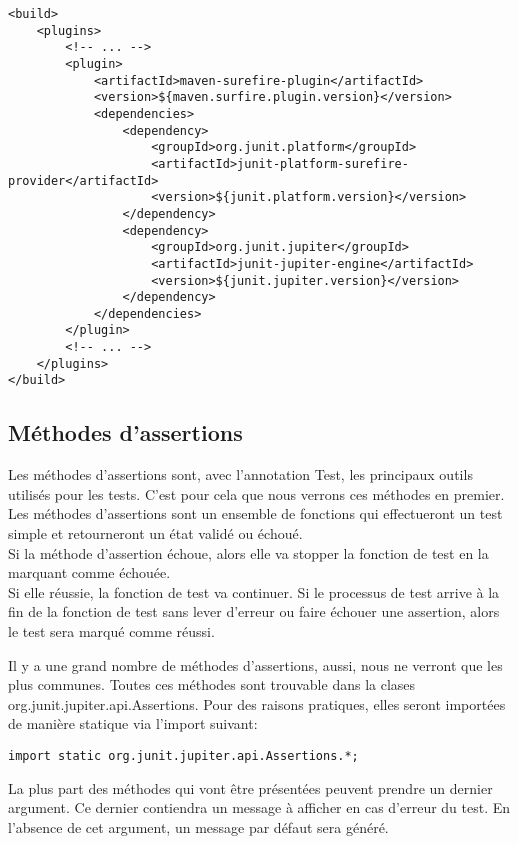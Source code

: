 \documentclass[12pt]{article}		%
\begin{document}
\lstset{language=XML, numbers=left}
\begin{lstlisting}
<build>
    <plugins>
    	<!-- ... -->
        <plugin>
            <artifactId>maven-surefire-plugin</artifactId>
            <version>${maven.surfire.plugin.version}</version>
            <dependencies>
                <dependency>
                    <groupId>org.junit.platform</groupId>
                    <artifactId>junit-platform-surefire-provider</artifactId>
                    <version>${junit.platform.version}</version>
                </dependency>
                <dependency>
                    <groupId>org.junit.jupiter</groupId>
                    <artifactId>junit-jupiter-engine</artifactId>
                    <version>${junit.jupiter.version}</version>
                </dependency>
            </dependencies>
        </plugin>
    	<!-- ... -->
    </plugins>
</build>
\end{lstlisting}

\subsection{Méthodes d'assertions}

Les méthodes d'assertions sont, avec l'annotation Test, les principaux outils utilisés pour les tests. C'est pour cela que nous verrons ces méthodes en premier. Les méthodes d'assertions sont un ensemble de fonctions qui effectueront un test simple et retourneront un état validé ou échoué. \\ Si la méthode d'assertion échoue, alors elle va stopper la fonction de test en la marquant comme échouée. \\ Si elle réussie, la fonction de test va continuer. Si le processus de test arrive à la fin de la fonction de test sans lever d'erreur ou faire échouer une assertion, alors le test sera marqué comme réussi.

Il y a une grand nombre de méthodes d'assertions, aussi, nous ne verront que les plus communes. Toutes ces méthodes sont trouvable dans la clases org.junit.jupiter.api.Assertions. Pour des raisons pratiques, elles seront importées de manière statique via l'import suivant:

\lstset{language=Java, numbers=left}
\begin{lstlisting}
import static org.junit.jupiter.api.Assertions.*;
\end{lstlisting}

La plus part des méthodes qui vont être présentées peuvent prendre un dernier argument. Ce dernier contiendra un message à afficher en cas d'erreur du test. En l'absence de cet argument, un message par défaut sera généré.
\end{document}
